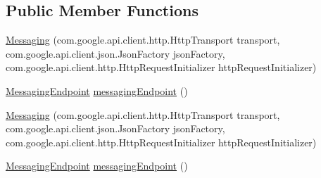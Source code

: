 \subsection*{Public Member Functions}
\begin{DoxyCompactItemize}
\item 
\hyperlink{classcom_1_1example_1_1lusifer_1_1myapplication_1_1backend_1_1messaging_1_1_messaging_aab2adbf277996470106a1ef87eed641e}{Messaging} (com.\+google.\+api.\+client.\+http.\+Http\+Transport transport, com.\+google.\+api.\+client.\+json.\+Json\+Factory json\+Factory, com.\+google.\+api.\+client.\+http.\+Http\+Request\+Initializer http\+Request\+Initializer)
\item 
\hyperlink{classcom_1_1example_1_1lusifer_1_1myapplication_1_1backend_1_1messaging_1_1_messaging_1_1_messaging_endpoint}{Messaging\+Endpoint} \hyperlink{classcom_1_1example_1_1lusifer_1_1myapplication_1_1backend_1_1messaging_1_1_messaging_a7d50229f5b29ebaadd6737a7fc645e0a}{messaging\+Endpoint} ()
\item 
\hyperlink{classcom_1_1example_1_1lusifer_1_1myapplication_1_1backend_1_1messaging_1_1_messaging_aab2adbf277996470106a1ef87eed641e}{Messaging} (com.\+google.\+api.\+client.\+http.\+Http\+Transport transport, com.\+google.\+api.\+client.\+json.\+Json\+Factory json\+Factory, com.\+google.\+api.\+client.\+http.\+Http\+Request\+Initializer http\+Request\+Initializer)
\item 
\hyperlink{classcom_1_1example_1_1lusifer_1_1myapplication_1_1backend_1_1messaging_1_1_messaging_1_1_messaging_endpoint}{Messaging\+Endpoint} \hyperlink{classcom_1_1example_1_1lusifer_1_1myapplication_1_1backend_1_1messaging_1_1_messaging_a7d50229f5b29ebaadd6737a7fc645e0a}{messaging\+Endpoint} ()
\end{DoxyCompactItemize}
